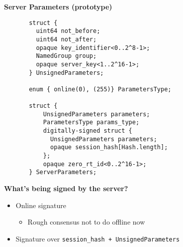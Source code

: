 \documentclass[helvetica]{seminar}
\newcommand{\heading}[1]{%
  \begin{center} 
    \large\bf 
    #1 
  \end{center} 
  \vspace{.4 in}}
\begin{document}
\begin{slide}
\heading{Server Parameters (prototype)}
\vspace{-.25in}
{\scriptsize
\begin{verbatim}
       struct {
         uint64 not_before;
         uint64 not_after;
         opaque key_identifier<0..2^8-1>;
         NamedGroup group;
         opaque server_key<1..2^16-1>;
       } UnsignedParameters;

       enum { online(0), (255)} ParametersType;
       
       struct {
           UnsignedParameters parameters;
           ParametersType params_type;
           digitally-signed struct {
             UnsignedParameters parameters;
             opaque session_hash[Hash.length];
           };
           opaque zero_rt_id<0..2^16-1>;
       } ServerParameters;

\end{verbatim}
}
\end{slide}

\begin{slide}
\heading{What's being signed by the server?}

\begin{itemize}
\item Online signature
  \begin{itemize}
  \item Rough consensus not to do offline now
  \end{itemize}
  
\item Signature over \verb^session_hash + UnsignedParameters^
\end{itemize}
\end{slide}
\end{document}

